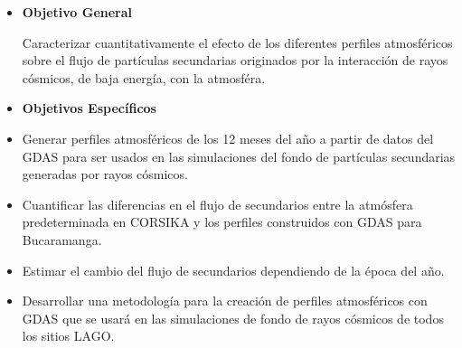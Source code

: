 \newpage


\begin{itemize}
\item \textbf{Objetivo General}

Caracterizar cuantitativamente el efecto de los diferentes perfiles atmosféricos sobre el flujo de partículas secundarias originados por la interacción de rayos cósmicos, de baja energía, con la atmosféra.

\item \textbf{Objetivos Espec\'ificos}
\end{itemize}
\begin{itemize}
\item Generar perfiles atmosféricos de los 12 meses del a\~no a partir de datos del GDAS para ser usados en las simulaciones del fondo de partículas secundarias generadas por rayos cósmicos.
\item Cuantificar las diferencias en el flujo de secundarios entre la atmósfera predeterminada en CORSIKA y los perfiles construidos con GDAS para Bucaramanga.
\item Estimar el cambio del flujo de secundarios dependiendo de la época del año.
\item Desarrollar una metodología para la creación de perfiles atmosféricos con GDAS que se usará en las simulaciones
de fondo de rayos cósmicos de todos los sitios LAGO.
\end{itemize}

\newpage
